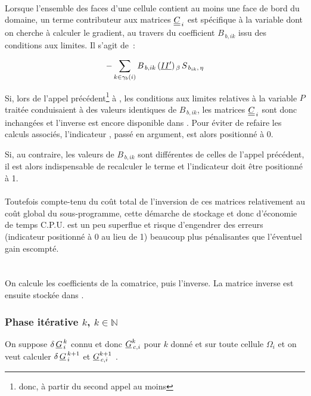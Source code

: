 {\hspace*{2cm}{\bf Cellule poss\'edant au moins une face de bord }\\
Lorsque l'ensemble des faces d'une cellule contient au moins une face de bord
du domaine, un terme contributeur aux matrices  $\underline{\underline{C}}_{\,i}$ est
sp\'ecifique \`a la variable dont on cherche
\`a calculer le gradient, au travers du coefficient $B_{\,b,ik}$
issu des conditions aux limites. Il s'agit de~:

\begin{equation}\notag
- \displaystyle\sum\limits_{k\in\gamma_b(i)}
B_{\,b,ik}\,(\underline{II'})_{\,\beta} \,S_{\,{b}_{ik},\,\eta}
\end{equation}

Si, lors de l'appel pr\'ec\'edent\footnote{donc, \`a partir du second appel au
moins}  \`a ,
les conditions aux limites relatives \`a la
variable $P$ trait\'ee conduisaient \`a des valeurs identiques de $B_{\,b,ik}$, les
matrices $\underline{\underline{C}}_{\,i}$ sont donc inchang\'ees et l'inverse  est encore
disponible  dans . Pour \'eviter de refaire les calculs associ\'es,
l'indicateur , pass\'e en argument, est alors positionn\'e \`a 0.

Si, au contraire, les valeurs de $B_{\,b,ik}$  sont diff\'erentes de celles de
l'appel pr\'ec\'edent, il est alors
indispensable de recalculer le terme et l'indicateur  doit \^etre
positionn\'e \`a 1.\\\\
Toutefois compte-tenu du co\^ut total de l'inversion de ces matrices relativement
au co\^ut global du sous-programme, cette d\'emarche de stockage et donc
d'\'economie de temps C.P.U. est un peu
superflue et risque d'engendrer des erreurs (indicateur 
positionn\'e \`a 0 au lieu de 1) beaucoup plus p\'enalisantes que l'\'eventuel
gain escompt\'e.\\\\
\hspace*{1,5cm}{\bf Inversion de la matrice}\\
On calcule les coefficients de la comatrice, puis l'inverse.
La matrice inverse est ensuite stock\'ee dans .\\
\hspace*{1cm}\subsubsection*{\bf Phase it\'erative $k$, $k\in \mathbb{N}$}
On suppose  $\delta\,\underline{G}^{\,k}_{\,i}$ connu et donc  $\underline{G}^{k}_{\,c,i}$ pour $k$ donn\'e et sur
toute cellule $\Omega_{i}$ et on veut calculer
$\delta\,\underline{G}^{\,k+1}_{\,i}$ et $\underline{G}^{k+1}_{\,c,i}$ .\\

}
